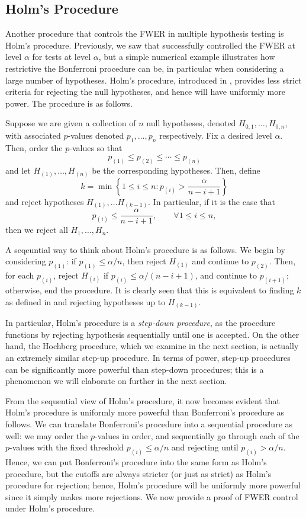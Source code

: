 \subsection{Holm's Procedure}
Another procedure that controls the FWER in multiple hypothesis testing is Holm's procedure. Previously, we saw that  successfully controlled the FWER at level $\alpha$ for tests at level $\alpha$, but a simple numerical example illustrates how restrictive the Bonferroni procedure can be, in particular when considering a large number of hypotheses. Holm's procedure, introduced in \cite{holms}, provides less strict criteria for rejecting the null hypotheses, and hence will have uniformly more power. The procedure is as follows.
\begin{proc}
\label{holmproc}
Suppose we are given a collection of $n$ null hypotheses, denoted $H_{0, 1}, \ldots, H_{0, n}$, with associated $p$-values denoted $p_1, \ldots, p_n$ respectively. Fix a desired level $\alpha$. Then, order the $p$-values so that
\[ p_{(1)} \leq p_{(2)} \leq \cdots \leq p_{(n)} \] and let $H_{(1)}, \ldots, H_{(n)}$ be the corresponding hypotheses. Then, define
\[ k = \min \left\{ 1 \leq i \leq n : p_{(i)} > \frac{\alpha}{n - i + 1} \right \}  \] and reject hypotheses $H_{(1)}, \ldots H_{(k-1)}$. In particular, if it is the case that 
\[ p_{(i)} \leq \frac{\alpha}{n - i + 1}, \qquad \forall 1 \leq i \leq n, \] then we reject all $H_1, \ldots, H_n$.
\end{proc}
\begin{note*}
A seqeuntial way to think about Holm's procedure is as follows. We begin by considering $p_{(1)}$: if $p_{(1)} \leq \alpha / n$, then reject $H_{(1)}$ and continue to $p_{(2)}$. Then, for each $p_{(i)}$, reject $H_{(i)}$ if $p_{(i)} \leq \alpha / (n - i + 1)$, and continue to $p_{(i+1)}$; otherwise, end the procedure. It is clearly seen that this is equivalent to finding $k$ as defined in  and rejecting hypotheses up to $H_{(k-1)}$.

In particular, Holm's procedure is a \emph{step-down procedure}, as the procedure functions by rejecting hypothesis sequentially until one is accepted. On the other hand, the Hochberg procedure, which we examine in the next section, is actually an extremely similar step-up procedure. In terms of power, step-up procedures can be significantly more powerful than step-down procedures; this is a phenomenon we will elaborate on further in the next section.
\end{note*}
From the sequential view of Holm's procedure, it now becomes evident that Holm's procedure is uniformly more powerful than Bonferroni's procedure as follows. We can translate Bonferroni's procedure into a sequential procedure as well: we may order the $p$-values in order, and sequentially go through each of the $p$-values with the fixed threshold $p_{(i)} \leq \alpha / n$ and rejecting until $p_{(i)} > \alpha / n$. Hence, we can put Bonferroni's procedure into the same form as Holm's procedure, but the cutoffs are always stricter (or just as strict) as Holm's procedure for rejection; hence, Holm's procedure will be uniformly more powerful since it simply makes more rejections. We now provide a proof of FWER control under Holm's procedure.
